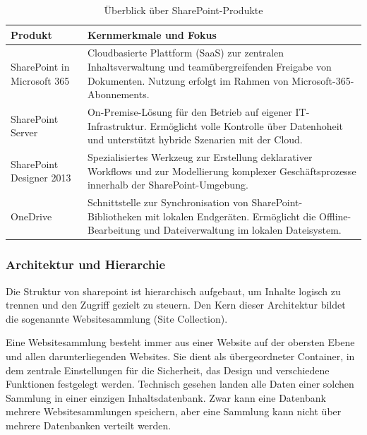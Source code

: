 \begin{table}[H]
    \centering
    \caption{Überblick über SharePoint-Produkte \cite{Microsoft.2024.SharePointSupport}}
    \begin{tabular}{p{4cm} p{10cm}}
        \textbf{Produkt} & \textbf{Kernmerkmale und Fokus} \\ \hline

        SharePoint in Microsoft 365 &
        Cloudbasierte Plattform (SaaS) zur zentralen Inhaltsverwaltung und
        teamübergreifenden Freigabe von Dokumenten. Nutzung erfolgt im Rahmen von
        Microsoft-365-Abonnements. \\ \hline

        SharePoint Server &
        On-Premise-Lösung für den Betrieb auf eigener IT-Infrastruktur. Ermöglicht
        volle Kontrolle über Datenhoheit und unterstützt hybride Szenarien mit der
        Cloud. \\ \hline

        SharePoint Designer 2013 &
        Spezialisiertes Werkzeug zur Erstellung deklarativer Workflows und zur
        Modellierung komplexer Geschäftsprozesse innerhalb der
        SharePoint-Umgebung. \\ \hline

        OneDrive &
        Schnittstelle zur Synchronisation von SharePoint-Bibliotheken mit lokalen
        Endgeräten. Ermöglicht die Offline-Bearbeitung und Dateiverwaltung im
        lokalen Dateisystem. \\ \hline
    \end{tabular}
\end{table}

\subsubsection{Architektur und Hierarchie}

Die Struktur von \gls{sharepoint} ist hierarchisch aufgebaut, um Inhalte logisch zu
trennen und den Zugriff gezielt zu steuern. Den Kern dieser Architektur bildet die
sogenannte Websitesammlung (Site Collection). \cite{Microsoft2023,kampffmeyer2006ecm}

Eine Websitesammlung besteht immer aus einer Website auf der obersten Ebene und
allen darunterliegenden Websites. Sie dient als übergeordneter Container, in dem
zentrale Einstellungen für die Sicherheit, das Design und verschiedene Funktionen
festgelegt werden. Technisch gesehen landen alle Daten einer solchen Sammlung in
einer einzigen Inhaltsdatenbank. Zwar kann eine Datenbank mehrere
Websitesammlungen speichern, aber eine Sammlung kann nicht über mehrere Datenbanken
verteilt werden. \cite{Microsoft2023}

